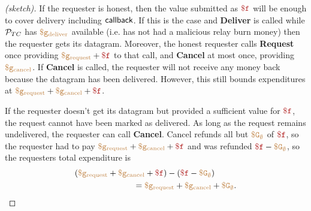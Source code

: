 \begin{proof}[(sketch)]
If the requester is honest, then the value submitted as $\fee$ will be enough to cover delivery including ${\sf callback}$.
If this is the case and {\bf Deliver} is called while ${\cal P}_{TC}$ has $\tt {\color{brown} \$g_\text{deliver} }$ available (i.e. has not had a malicious relay burn money)
then the requester gets its datagram.
Moreover, the honest requester calls {\bf Request} once providing $\gasrequest + \fee$ to that call, and {\bf Cancel} at most once, providing $\tt {\color{brown} \$g_\text{cancel} }$.
If {\bf Cancel} is called, the requester will not receive any money back because the datagram has been delivered.
However, this still bounds expenditures at $\gasrequest + \gascancel + \fee$.

If the requester doesn't get its datagram but provided a sufficient value for $\fee$, the request cannot have been marked as delivered.
As long as the request remains undelivered, the requester can call {\bf Cancel}.
Cancel refunds all but $\tt {\color{brown} \$G_\emptyset }$ of $\fee$, so the requester had to pay $\gasrequest + \gascancel + \fee$ and was refunded $\fee - \constgascancel$, so the requesters total expenditure is
\begin{align*}
  (\gasrequest + \gascancel + \fee) - (\fee - \constgascancel& ) \\ = \gasrequest + \gascancel & + \constgascancel.
\end{align*}
\end{proof}



